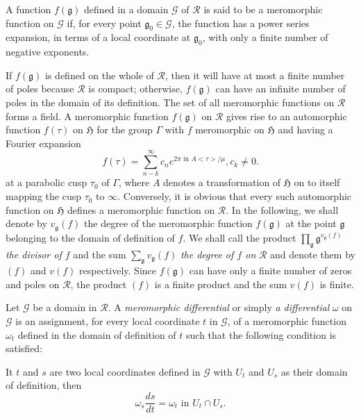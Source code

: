 \begin{defi*}
A function $f(\mathfrak{g})$ defined in a domain $\mathcal{G}$ of
$\mathscr{R}$ is said to be a meromorphic function on $\mathcal{G}$
if, for every point $\mathfrak{g}_0 \in \mathcal{G}$, the
function has a power series expansion, in terms of a local coordinate
at $\mathfrak{g}_0$, with only a finite number of negative exponents.
\end{defi*}

If $f(\mathfrak{g})$ is defined on the whole of $\mathscr{R}$, then it
will have at most a finite number of poles because $\mathscr{R}$ is
compact; otherwise, $f(\mathfrak{g})$ can have an infinite number of
poles in the domain of its definition. The set of all meromorphic
functions on $\mathscr{R}$ forms a field. A meromorphic function
$f(\mathfrak{g})$ on $\mathscr{R}$ gives rise to an \pageoriginale
automorphic function $f(\tau)$ on $\mathfrak{H}$ for the group
$\Gamma$ with $f$ meromorphic on $\mathfrak{H}$ and having a Fourier
expansion 
$$
f(\tau) = \sum^{\infty}_{n-k} c_n e^{2\pi \text{ in } A <\tau>/\mu},
c_k \neq 0.
$$
at a parabolic cusp $\tau_0$ of $\Gamma$, where $A$ denotes a
transformation of $\mathfrak{H}$ on to itself mapping the cusp
$\tau_0$ to $\infty$. Conversely, it is obvious that every such
automorphic function on $\mathfrak{H}$ defines a meromorphic function
on $\mathscr{R}$. In the following, we shall denote by
$v_{\mathfrak{g}}(f)$ the degree of the meromorphic function
$f(\mathfrak{g})$ at the point $\mathfrak{g}$ belonging to the domain
of definition of $f$. We shall call the product $\prod\limits_{\mathfrak{g}}
\mathfrak{g}^{v_{\mathfrak{g}}(f)}$ \textit{the divisor of $f$} and
the sum $\sum\limits_{\mathfrak{g}} v_{\mathfrak{g}}(f)$ \textit{the degree
  of $f$ on} $\mathscr{R}$ and denote them by $(f)$ and $v(f)$
respectively. Since $f(\mathfrak{g})$ can have only a finite number of
zeros and poles on $\mathscr{R}$, the product $(f)$ is a finite
product and the sum $v(f)$ is finite.

\begin{defi*}
Let $\mathcal{G}$ be a domain in $\mathscr{R}$. A \textit{meromorphic
differential} or simply \textit{a differential} $\omega$ on
$\mathcal{G}$ is an assignment, for every local coordinate $t$ in
$\mathcal{G}$, of a meromorphic function $\omega_t$ defined in the
domain of definition of $t$ such that the following condition is
satisfied:
\end{defi*}

It $t$ and $s$ are two local coordinates defined in $\mathcal{G}$ with
$U_t$ and $U_s$ as their domain of definition, then 
$$
\omega_s \frac{ds}{dt} = \omega_t \text{ in } U_t \cap U_s.
$$


